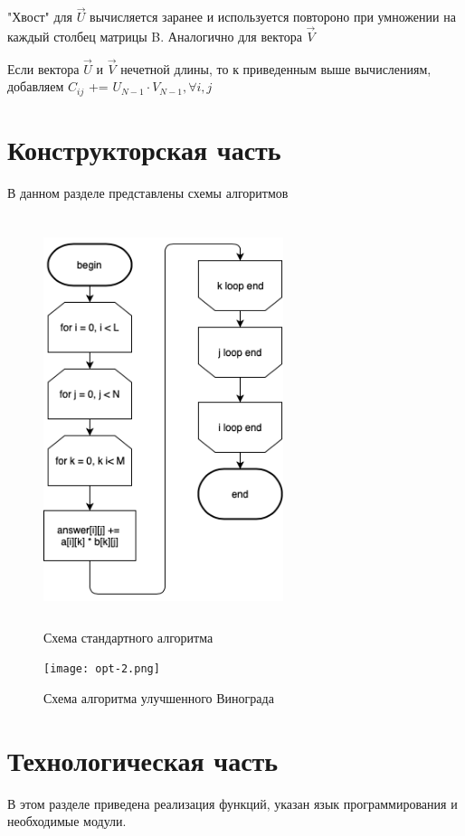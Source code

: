 \documentclass[12pt]{article}
\begin{document}
"Хвост" для  $\vec{U}$ вычисляется заранее и используется повтороно при умножении на каждый столбец матрицы B. Аналогично для вектора $\vec{V}$

Если вектора $\vec{U}$ и $\vec{V}$ нечетной длины, то к приведенным выше вычислениям, добавляем 
$C_{ij}$ += $U_{N-1}\cdot V_{N-1}, \forall i,j$
\\
\newpage
\section{Конструкторская часть}
В данном разделе представлены схемы алгоритмов 

\begin{figure}[ht!]
	\centering
	\includegraphics[width=70mm, height=120mm]{multiply.png}
	\caption{Схема стандартного алгоритма\label{overflow}}
\end{figure}
\newpage
\newpage
\begin{figure}[ht!]
	\centering
	\texttt{[image: opt-2.png]}
	\caption{Схема алгоритма улучшенного Винограда \label{overflow}}
\end{figure}

\newpage
\newpage

\section{Технологическая часть}

В этом разделе приведена реализация функций, указан язык программирования и необходимые модули. 
\end{document}
